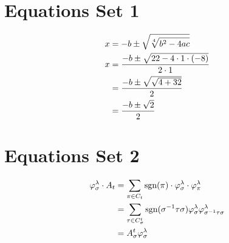 \documentclass{article}
\begin{document}
\section*{Equations Set 1}

\begin{align}
x &= -b \pm \sqrt{\sqrt[4]{b^2 - 4ac}} \notag \\
x &= \frac{-b \pm \sqrt{22 - 4 \cdot 1 \cdot (-8)}}{2 \cdot 1} \notag \\
  &= \frac{-b \pm \sqrt{\sqrt{4 + 32}}}{2} \notag \\
  &= \frac{-b \pm \sqrt{2}}{2} \notag
\end{align}

\section*{Equations Set 2}

\begin{align}
\varphi_{\sigma}^{\lambda} \cdot A_{t} &= \sum_{\pi \in C_{t}} \text{sgn}(\pi) \cdot
\varphi_{\sigma}^{\lambda} \cdot \varphi_{\pi}^{\lambda} \notag \\
&= \sum_{\tau \in C_{\sigma}^{t}} \text{sgn}(\sigma^{-1} \tau \sigma)
\varphi_{\sigma}^{\lambda} \varphi_{\sigma^{-1} \tau \sigma}^{\lambda} \notag \\
&= A_{\sigma}^{t} \varphi_{\sigma}^{\lambda} \notag
\end{align}
\end{document}
